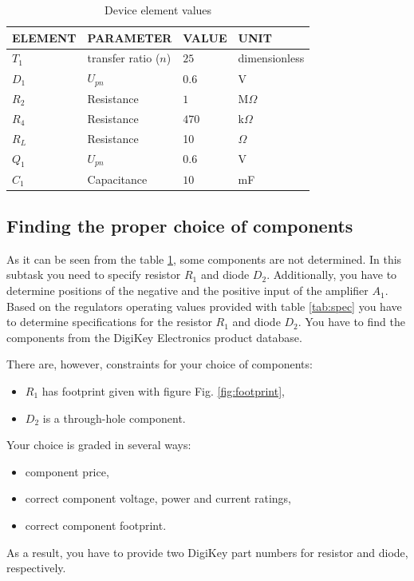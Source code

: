 \documentclass[a4paper]{article}
\begin{document}
\begin{table}[h!]
    \caption{Device element values}
    \label{tab:elems}
    \begin{tabularx}{\linewidth}{|X|X|X|X|} \hline
    ELEMENT & PARAMETER & VALUE & UNIT \\ \hline
    $T_1$ & transfer ratio ($n$) & $25$ &  dimensionless \\ \hline
    $D_1$ & $U_{pn}$ & $0.6$ & V \\ \hline 
    $R_2$ & Resistance & $1$ & M$\Omega$ \\ \hline
    $R_4$ & Resistance & $470$ & k$\Omega$ \\ \hline
    $R_L$ & Resistance & 10 & $\Omega$ \\ \hline
    $Q_1$ & $U_{pn}$ & $0.6$ & V \\ \hline
    $C_1$ & Capacitance & $10$ & mF \\ \hline
    \end{tabularx}
\end{table}

\newpage

\subsection{Finding the proper choice of components}
\label{ele:task:1}
As it can be seen from the table \ref{tab:elems}, some components are not 
determined. In this subtask you need to specify resistor $R_1$ and diode $D_2$. 
Additionally, you have to determine positions of the negative and the positive 
input of the amplifier $A_1$. Based on the regulators operating values 
provided with table \ref{tab:spec} you have to determine specifications for 
the resistor $R_1$ and diode $D_2$. You have to find the components from the 
DigiKey Electronics product database. 

There are, however, constraints for your choice of components:
\begin{itemize}
\item $R_1$ has footprint given with figure Fig. \ref{fig:footprint},
\item $D_2$ is a through-hole component.
\end{itemize} 
 
Your choice is graded in several ways:
\begin{itemize}
\item component price,
\item correct component voltage, power and current ratings,
\item correct component footprint.
\end{itemize}
As a result, you have to provide two DigiKey part numbers for resistor and 
diode, respectively.
\end{document}
